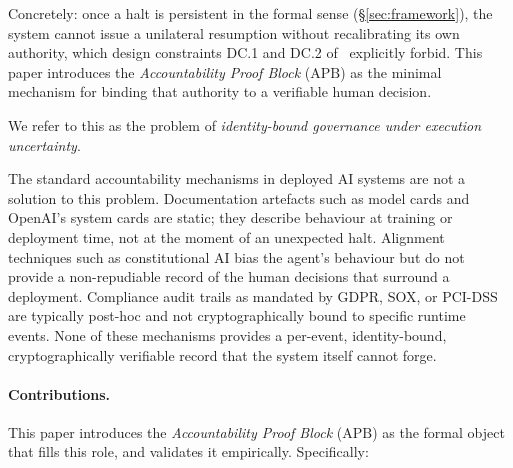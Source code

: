 \documentclass[11pt]{article}
\newcommand{\APB}{\mathrm{APB}}
\begin{document}
Concretely: once a halt is persistent in the formal sense
(\S\ref{sec:framework}), the system cannot issue a unilateral resumption
without recalibrating its own authority, which design constraints DC.1
and DC.2 of~\citep{fernandez2026applied} explicitly forbid.
This paper introduces the \emph{Accountability Proof Block} ($\APB$) as
the minimal mechanism for binding that authority to a verifiable human
decision.

We refer to this as the problem of \emph{identity-bound governance under
execution uncertainty}.

The standard accountability mechanisms in deployed AI systems are not a
solution to this problem. Documentation artefacts such as model cards
\citep{mitchell2019model} and OpenAI's system cards
\citep{openai2024systemcard} are static; they describe behaviour at training
or deployment time, not at the moment of an unexpected halt. Alignment
techniques such as constitutional AI \citep{bai2022constitutional} bias the
agent's behaviour but do not provide a non-repudiable record of the
human decisions that surround a deployment. Compliance audit trails as
mandated by GDPR, SOX, or PCI-DSS are typically post-hoc and not
cryptographically bound to specific runtime events. None of these
mechanisms provides a per-event, identity-bound, cryptographically
verifiable record that the system itself cannot forge.

\paragraph{Contributions.}
This paper introduces the \emph{Accountability Proof Block} ($\APB$) as
the formal object that fills this role, and validates it empirically.
Specifically:
\end{document}
